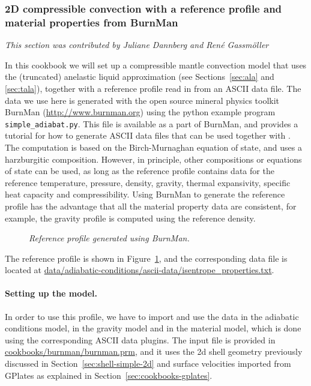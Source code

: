 \subsubsection{2D compressible convection with a reference profile and material properties from BurnMan}
\label{sec:cookbooks-burnman}
\textit{This section was contributed by Juliane Dannberg and Ren{\'e} Gassm{\"o}ller}

In this cookbook we will set up a compressible mantle convection model that uses
the (truncated) anelastic liquid approximation (see Sections~\ref{sec:ala} and
\ref{sec:tala}), together with a reference profile read in from an ASCII data file.
The data we use here is generated with the open source mineral physics toolkit BurnMan
(\url{http://www.burnman.org}) using the python example program \texttt{simple\_adiabat.py}.
This file is available as a part of BurnMan, and provides a tutorial for how to generate
ASCII data files that can be used together with \aspect{}.
The computation is based on the Birch-Murnaghan equation of state, and uses a harzburgitic
composition. However, in principle, other compositions or equations of state can be used,
as long as the reference profile contains data for the reference temperature, pressure, density,
gravity, thermal expansivity, specific heat capacity and compressibility. Using BurnMan
to generate the reference profile has the advantage that all the material property data
are consistent, for example, the gravity profile is computed using the reference density.
\begin{figure}
  
  \caption{\it Reference profile generated using BurnMan.}
  \label{fig:burnman-reference-profile}
\end{figure}
The reference profile is shown in Figure~\ref{fig:burnman-reference-profile}, and the corresponding data file
is located at \url{data/adiabatic-conditions/ascii-data/isentrope_properties.txt}.

\paragraph{Setting up the \aspect{} model.}
In order to use this profile, we have to import and use the data in the adiabatic conditions
model, in the gravity model and in the material model, which is done using the corresponding
ASCII data plugins. The input file is provided in \url{cookbooks/burnman/burnman.prm}, and it uses the
2d shell geometry previously discussed in Section~\ref{sec:shell-simple-2d} and surface velocities
imported from GPlates as explained in Section~\ref{sec:cookbooks-gplates}.

